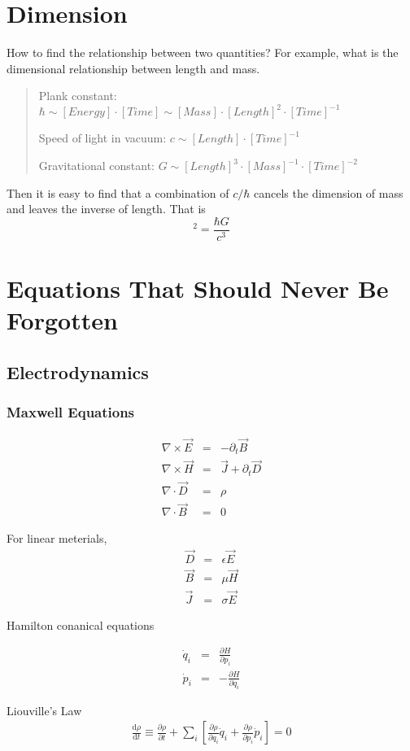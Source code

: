 
\section{Dimension}

How to find the relationship between two quantities? For example, what is the dimensional relationship between length and mass.
\begin{quotation}
Plank constant: $\hbar \sim [Energy]\cdot [Time] \sim [Mass]\cdot [Length]^2 \cdot [Time]^{-1}$ 

Speed of light in vacuum: $c\sim [Length]\cdot [Time]^{-1}$

Gravitational constant: $G \sim [Length]^3\cdot [Mass]^{-1} \cdot [Time]^{-2}$
\end{quotation}

Then it is easy to find that a combination of $c/\hbar$ cancels the dimension of mass and leaves the inverse of length. That is
\begin{equation}
[Length]^2 = \frac{\hbar G}{c^3}
\end{equation}



\section{Equations That Should Never Be Forgotten}

\subsection{Electrodynamics}

\subsubsection{Maxwell Equations}
\begin{eqnarray}
\nabla\times\vec E&=&-\partial_t \vec B \\
\nabla\times\vec H&=&\vec J+\partial_t \vec D \\
\nabla\cdot \vec D&=&\rho \\
\nabla\cdot \vec B&=&0
\end{eqnarray}

For linear meterials, \begin{eqnarray}
\vec D&=&\epsilon \vec E \\
\vec B&=&\mu \vec H \\
\vec J&=& \sigma \vec E
\end{eqnarray}


Hamilton conanical equations

\begin{eqnarray}
\dot q_i &=& \frac{\partial H}{\partial p_i}  \\
\dot p_i &=& - \frac{\partial H}{\partial q_i}
\end{eqnarray}


Liouville's Law
\begin{eqnarray}
\frac{\mathrm d \rho}{\mathrm d t}\equiv \frac{\partial \rho}{\partial t} + \sum_i \left[ \frac{\partial \rho}{\partial q_i}\dot q_i + \frac{\partial \rho}{\partial p_i}\dot p_i \right] = 0
\end{eqnarray}
